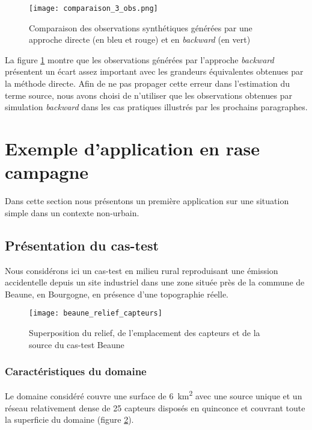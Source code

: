 \begin{figure}[h!]
	\centering
	\texttt{[image: comparaison\_3\_obs.png]}
	\caption{Comparaison des observations synthétiques générées par une approche directe (en bleu et rouge) et en \textit{backward} (en vert)}
	\label{fig_comparaison_3_obs}
\end{figure}

La figure \ref{fig_comparaison_3_obs} montre que les observations générées par l'approche \textit{backward} présentent un écart assez important avec les grandeurs équivalentes obtenues par la méthode directe. Afin de ne pas propager cette erreur dans l'estimation du terme source, nous avons choisi de n'utiliser que les observations obtenues par simulation \textit{backward} dans les cas pratiques illustrés par les prochains paragraphes.\\




\section{Exemple d'application en rase campagne}

Dans cette section nous présentons un première application sur une situation  simple dans un contexte non-urbain.

\subsection{Présentation du cas-test}

Nous considérons ici un cas-test en milieu rural reproduisant une émission accidentelle depuis un site industriel dans une zone située près de la commune de Beaune, en Bourgogne, en présence d'une topographie réelle. 

\begin{figure}[h!]
	\centering
	\texttt{[image: beaune\_relief\_capteurs]}
	\caption{Superposition du relief, de l'emplacement des capteurs et de la source du cas-test Beaune}
	\label{fig_beaune_relief}
\end{figure}

\subsubsection{Caractéristiques du domaine}
Le domaine considéré couvre une surface de \SI{6}{\square\kilo\meter} avec une source unique et un réseau relativement dense de 25 capteurs disposés en quinconce et couvrant toute la superficie du domaine (figure \ref{fig_beaune_relief}).

